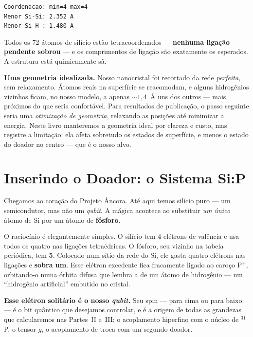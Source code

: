 \documentclass[11pt,a4paper,openany]{book}
\newcommand{\qubit}{\emph{qubit}}
\begin{document}
\begin{lstlisting}[style=console]
Coordenacao: min=4 max=4
Menor Si-Si: 2.352 A
Menor Si-H : 1.480 A
\end{lstlisting}

\noindent
Todos os 72 átomos de silício estão tetracoordenados --- \textbf{nenhuma ligação
pendente sobrou} --- e os comprimentos de ligação são exatamente os esperados.
A estrutura está quimicamente sã.

\begin{caixaatencao}
\textbf{Uma geometria idealizada.} Nosso nanocristal foi recortado da rede
\emph{perfeita}, sem relaxamento. Átomos reais na superfície se reacomodam, e
alguns hidrogênios vizinhos ficam, no nosso modelo, a apenas $\sim 1{,}4$~Å uns
dos outros --- mais próximos do que seria confortável. Para resultados de
publicação, o passo seguinte seria uma \emph{otimização de geometria}, relaxando
as posições até minimizar a energia. Neste livro manteremos a geometria ideal por
clareza e custo, mas registre a limitação: ela afeta sobretudo os estados de
superfície, e menos o estado do doador no centro --- que é o nosso alvo.
\end{caixaatencao}

\section{Inserindo o Doador: o Sistema Si:P}
\label{sec:doador}

Chegamos ao coração do Projeto Âncora. Até aqui temos silício puro --- um
semicondutor, mas não um \qubit{}. A mágica acontece ao substituir \emph{um único}
átomo de Si por um átomo de \textbf{fósforo}.

O raciocínio é elegantemente simples. O silício tem 4 elétrons de valência e usa
todos os quatro nas ligações tetraédricas. O fósforo, seu vizinho na tabela
periódica, tem \textbf{5}. Colocado num sítio da rede do Si, ele gasta quatro
elétrons nas ligações e \textbf{sobra um}. Esse elétron excedente fica fracamente
ligado ao caroço P$^+$, orbitando-o numa órbita difusa que lembra a de um átomo de
hidrogênio --- um ``hidrogênio artificial'' embutido no cristal.

\textbf{Esse elétron solitário é o nosso \qubit{}.} Seu spin --- para cima ou para
baixo --- é o bit quântico que desejamos controlar, e é a origem de todas as
grandezas que calcularemos nas Partes~II e~III: o acoplamento hiperfino com o
núcleo de $^{31}$P, o tensor $g$, o acoplamento de troca com um segundo doador.
\end{document}
